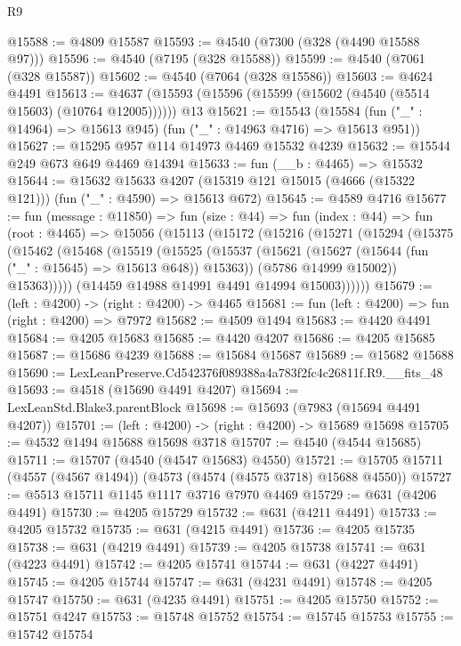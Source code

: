 \begin{lexlean}{R9}
\begin{coremodule}
@15588 := @4809 @15587
@15593 := @4540 (@7300 (@328 (@4490 @15588 @97)))
@15596 := @4540 (@7195 (@328 @15588))
@15599 := @4540 (@7061 (@328 @15587))
@15602 := @4540 (@7064 (@328 @15586))
@15603 := @4624 @4491
@15613 := @4637 (@15593 (@15596 (@15599 (@15602 (@4540 (@5514 @15603) (@10764 @12005)))))) @13
@15621 := @15543
    (@15584 (fun ("_" : @14964) => @15613 @945) (fun ("_" : @14963 @4716) => @15613 @951))
@15627 := @15295 @957 @114 @14973 @4469 @15532 @4239
@15632 := @15544 @249 @673 @649 @4469 @14394
@15633 := fun (__b : @4465) => @15532
@15644 := @15632
    @15633
    @4207
    (@15319 @121 @15015 (@4666 (@15322 @121)))
    (fun ("_" : @4590) => @15613 @672)
@15645 := @4589 @4716
@15677 := fun (message : @11850) =>
  fun (size : @44) =>
  fun (index : @44) =>
  fun (root : @4465) =>
  @15056
    (@15113
      (@15172
        (@15216
          (@15271
            (@15294
              (@15375
                (@15462
                  (@15468
                    (@15519
                      (@15525
                        (@15537
                          (@15621 (@15627 (@15644 (fun ("_" : @15645) => @15613 @648)) @15363))
                          (@5786 @14999 @15002))
                        @15363)))))
              (@14459 @14988 @14991 @4491 @14994 @15003))))))
@15679 := (left : @4200) -> (right : @4200) -> @4465
@15681 := fun (left : @4200) => fun (right : @4200) => @7972
@15682 := @4509 @1494
@15683 := @4420 @4491
@15684 := @4205 @15683
@15685 := @4420 @4207
@15686 := @4205 @15685
@15687 := @15686 @4239
@15688 := @15684 @15687
@15689 := @15682 @15688
@15690 := LexLeanPreserve.Cd542376f089388a4a783f2fc4c26811f.R9.__fits_48
@15693 := @4518 (@15690 @4491 @4207)
@15694 := LexLeanStd.Blake3.parentBlock
@15698 := @15693 (@7983 (@15694 @4491 @4207))
@15701 := (left : @4200) -> (right : @4200) -> @15689 @15698
@15705 := @4532 @1494 @15688 @15698 @3718
@15707 := @4540 (@4544 @15685)
@15711 := @15707 (@4540 (@4547 @15683) @4550)
@15721 := @15705 @15711 (@4557 (@4567 @1494)) (@4573 (@4574 (@4575 @3718) @15688 @4550))
@15727 := @5513 @15711 @1145 @1117 @3716 @7970 @4469
@15729 := @631 (@4206 @4491)
@15730 := @4205 @15729
@15732 := @631 (@4211 @4491)
@15733 := @4205 @15732
@15735 := @631 (@4215 @4491)
@15736 := @4205 @15735
@15738 := @631 (@4219 @4491)
@15739 := @4205 @15738
@15741 := @631 (@4223 @4491)
@15742 := @4205 @15741
@15744 := @631 (@4227 @4491)
@15745 := @4205 @15744
@15747 := @631 (@4231 @4491)
@15748 := @4205 @15747
@15750 := @631 (@4235 @4491)
@15751 := @4205 @15750
@15752 := @15751 @4247
@15753 := @15748 @15752
@15754 := @15745 @15753
@15755 := @15742 @15754

\end{coremodule}
\end{lexlean}
